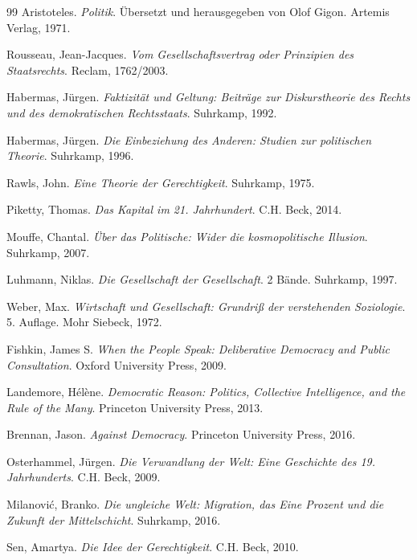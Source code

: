 \begin{thebibliography}{99}
     Aristoteles. \emph{Politik}. Übersetzt und herausgegeben von Olof Gigon. Artemis Verlag, 1971.
    
     Rousseau, Jean-Jacques. \emph{Vom Gesellschaftsvertrag oder Prinzipien des Staatsrechts}. Reclam, 1762/2003.
    
     Habermas, Jürgen. \emph{Faktizität und Geltung: Beiträge zur Diskurstheorie des Rechts und des demokratischen Rechtsstaats}. Suhrkamp, 1992.
    
     Habermas, Jürgen. \emph{Die Einbeziehung des Anderen: Studien zur politischen Theorie}. Suhrkamp, 1996.
    
     Rawls, John. \emph{Eine Theorie der Gerechtigkeit}. Suhrkamp, 1975.
    
     Piketty, Thomas. \emph{Das Kapital im 21. Jahrhundert}. C.H. Beck, 2014.
    
     Mouffe, Chantal. \emph{Über das Politische: Wider die kosmopolitische Illusion}. Suhrkamp, 2007.
    
     Luhmann, Niklas. \emph{Die Gesellschaft der Gesellschaft}. 2 Bände. Suhrkamp, 1997.
    
     Weber, Max. \emph{Wirtschaft und Gesellschaft: Grundriß der verstehenden Soziologie}. 5. Auflage. Mohr Siebeck, 1972.
    
     Fishkin, James S. \emph{When the People Speak: Deliberative Democracy and Public Consultation}. Oxford University Press, 2009.
    
     Landemore, Hélène. \emph{Democratic Reason: Politics, Collective Intelligence, and the Rule of the Many}. Princeton University Press, 2013.
    
     Brennan, Jason. \emph{Against Democracy}. Princeton University Press, 2016.
    
     Osterhammel, Jürgen. \emph{Die Verwandlung der Welt: Eine Geschichte des 19. Jahrhunderts}. C.H. Beck, 2009.
    
     Milanović, Branko. \emph{Die ungleiche Welt: Migration, das Eine Prozent und die Zukunft der Mittelschicht}. Suhrkamp, 2016.
    
     Sen, Amartya. \emph{Die Idee der Gerechtigkeit}. C.H. Beck, 2010.
    

\end{thebibliography}
